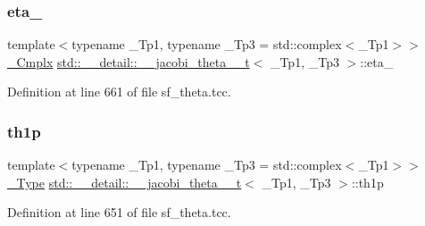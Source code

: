 \subsubsection{\texorpdfstring{eta\+\_}{eta\_3}}
{\footnotesize\ttfamily template$<$typename \+\_\+\+Tp1, typename \+\_\+\+Tp3 = std\+::complex$<$\+\_\+\+Tp1$>$$>$ \\
\hyperlink{structstd_1_1____detail_1_1____jacobi__theta__0__t_abe1df2c4f893fbb7c6fad023115f2fd6}{\+\_\+\+Cmplx} \hyperlink{structstd_1_1____detail_1_1____jacobi__theta__0__t}{std\+::\+\_\+\+\_\+detail\+::\+\_\+\+\_\+jacobi\+\_\+theta\+\_\+\_\+t}$<$ \+\_\+\+Tp1, \+\_\+\+Tp3 $>$\+::eta\+\_}



Definition at line 661 of file sf\+\_\+theta.\+tcc.

\mbox{\label{structstd_1_1____detail_1_1____jacobi__theta__0__t_afcb1323bca46b6303887c2901e3f4267}} 
\subsubsection{\texorpdfstring{th1p}{th1p}}
{\footnotesize\ttfamily template$<$typename \+\_\+\+Tp1, typename \+\_\+\+Tp3 = std\+::complex$<$\+\_\+\+Tp1$>$$>$ \\
\hyperlink{structstd_1_1____detail_1_1____jacobi__theta__0__t_a4aebcbdd8f3ab416a2fa770aa3784d63}{\+\_\+\+Type} \hyperlink{structstd_1_1____detail_1_1____jacobi__theta__0__t}{std\+::\+\_\+\+\_\+detail\+::\+\_\+\+\_\+jacobi\+\_\+theta\+\_\+\_\+t}$<$ \+\_\+\+Tp1, \+\_\+\+Tp3 $>$\+::th1p}



Definition at line 651 of file sf\+\_\+theta.\+tcc.

\mbox{\label{structstd_1_1____detail_1_1____jacobi__theta__0__t_a52fa2a47abbd60473139623927add27c}} 

